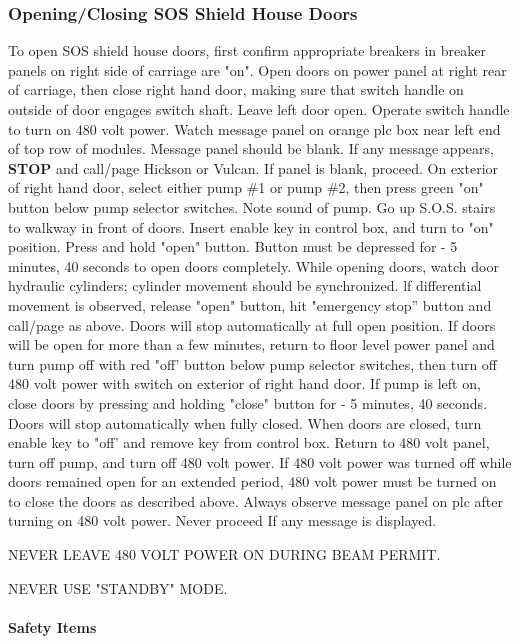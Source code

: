 \subsubsection{Opening/Closing SOS Shield House Doors}

To open SOS shield house doors, first confirm appropriate breakers in
breaker panels on right side of carriage are "on". Open doors on power
panel at right rear of carriage, then close right hand door, making sure
that switch handle on outside of door engages switch shaft. Leave left door
open.
Operate switch handle to turn on 480 volt power. Watch message panel on
orange plc box near left end of top row of modules. Message panel should be
blank. If any message appears, {\bf STOP} and call/page Hickson or
Vulcan.  If panel is
blank, proceed. On exterior of right hand door, select either pump \#1 or
pump \#2, then press green "on" button below pump selector switches. Note
sound of pump. Go up S.O.S. stairs to walkway in front of doors. Insert
enable key in control box, and turn to "on" position. Press and hold "open"
button. Button must be depressed for - 5 minutes, 40 seconds to open doors
completely. While opening doors, watch door hydraulic cylinders; cylinder
movement should be synchronized. lf differential movement is observed,
release "open" button, hit "emergency stop'' button and call/page as 
above.  Doors will stop automatically at full open position.
If doors will be open for more than a few minutes, return to floor level
power panel and turn pump off with red "off' button below pump selector
switches, then turn off 480 volt power with switch on exterior of right
hand door. If pump is left on, close doors by pressing and holding "close"
button for - 5 minutes, 40 seconds. Doors will stop automatically when
fully closed.  When doors are closed, turn enable key to "off' and remove
key from control box. Return to 480 volt panel, turn off pump, and turn off
480 volt power. If 480 volt power was turned off while doors remained open
for an extended period, 480 volt power must be turned on to close the doors
as described above. Always observe message panel on plc after turning on
480 volt power. Never proceed If any message is displayed.

NEVER LEAVE 480 VOLT POWER ON DURING BEAM PERMIT.

NEVER USE "STANDBY" MODE.



\paragraph{Safety Items}

